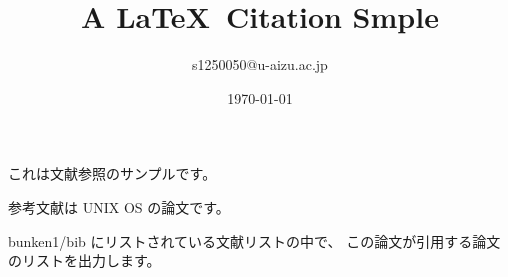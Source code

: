 \documentclass[a4paper]{jarticle}
\title{A \LaTeX ~Citation Smple }
\author{s1250050@u-aizu.ac.jp}
\date{\today}
\begin{document}
\maketitle

これは文献参照のサンプルです。

参考文献\cite{ritchie1974unix}は UNIX OS の論文です。

bunken1/bib にリストされている文献リストの中で、
この論文が引用する論文のリストを出力します。


\end{document}
